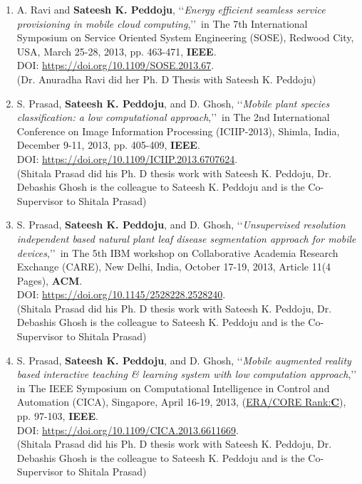 \begin{enumerate}
	
	\item
	A. Ravi and \textbf{Sateesh K. Peddoju}, \lq\lq \textit{Energy efficient seamless service provisioning in mobile cloud computing},\rq\rq\, in The 7th International Symposium on Service Oriented System Engineering (SOSE), Redwood City, USA, March 25-28, 2013, pp. 463-471, \textbf{IEEE}. \\DOI: \url{https://doi.org/10.1109/SOSE.2013.67}. \\(Dr. Anuradha Ravi did her Ph. D Thesis with Sateesh K. Peddoju)
	
	\item
	S. Prasad, \textbf{Sateesh K. Peddoju}, and D. Ghosh, \lq\lq \textit{Mobile plant species classification: a low computational approach},\rq\rq\, in The 2nd International Conference on Image Information Processing (ICIIP-2013), Shimla, India, December 9-11, 2013, pp. 405-409, \textbf{IEEE}. \\DOI: \url{https://doi.org/10.1109/ICIIP.2013.6707624}. \\(Shitala Prasad did his Ph. D thesis work with Sateesh K. Peddoju, Dr. Debashis Ghosh is the colleague to Sateesh K. Peddoju and is the Co-Supervisor to Shitala Prasad)

	
	\item
	S. Prasad, \textbf{Sateesh K. Peddoju}, and D. Ghosh, \lq\lq \textit{Unsupervised resolution independent based natural plant leaf disease segmentation approach for mobile devices},\rq\rq\, in The 5th IBM workshop on Collaborative Academia Research Exchange (CARE), New Delhi, India,  October 17-19, 2013, Article 11(4 Pages), \textbf{ACM}. \\DOI: \url{https://doi.org/10.1145/2528228.2528240}. \\(Shitala Prasad did his Ph. D thesis work with Sateesh K. Peddoju, Dr. Debashis Ghosh is the colleague to Sateesh K. Peddoju and is the Co-Supervisor to Shitala Prasad)

	
	\item
	S. Prasad, \textbf{Sateesh K. Peddoju}, and D. Ghosh, \lq\lq \textit{Mobile augmented reality based interactive teaching \& learning system with low computation approach},\rq\rq\, in The IEEE Symposium on Computational Intelligence in Control and Automation (CICA), Singapore, April 16-19, 2013, (\underline{ERA/CORE Rank:\textbf{C}}), pp. 97-103, \textbf{IEEE}. \\DOI: \url{https://doi.org/10.1109/CICA.2013.6611669}.\\(Shitala Prasad did his Ph. D thesis work with Sateesh K. Peddoju, Dr. Debashis Ghosh is the colleague to Sateesh K. Peddoju and is the Co-Supervisor to Shitala Prasad)


\end{enumerate}

